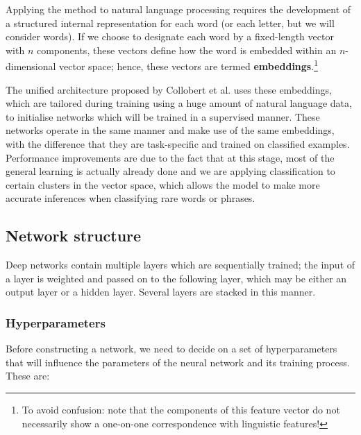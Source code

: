 Applying the method to natural language processing requires the
development of a structured internal representation for each word (or
each letter, but we will consider words).  If we choose to designate
each word by a fixed-length vector with $n$ components, these vectors
define how the word is embedded within an $n$-dimensional vector
space; hence, these vectors are termed
\textbf{embeddings}.\footnote{To avoid confusion: note that the
  components of this feature vector do not necessarily show a one-on-one
  correspondence with linguistic features!} 

The unified architecture proposed by Collobert et al. uses these
embeddings, which are tailored during training using a huge amount of
natural language data, to initialise networks which will be trained in
a supervised manner. These networks operate in the same manner and
make use of the same embeddings, with the difference that they are
task-specific and trained on classified examples. Performance
improvements are due to the fact that at this stage, most of the
general learning is actually already done and we are applying
classification to certain clusters in the vector space, which allows
the model to make more accurate inferences when classifying rare words
or phrases.

\subsection{Network structure}
\label{sec:networkstructure}

Deep networks contain multiple layers which are sequentially trained;
the input of a layer is weighted and passed on to the following layer,
which may be either an output layer or a hidden layer. Several layers
are stacked in this manner.

\subsubsection{Hyperparameters}

Before constructing a network, we need to decide on a set of
hyperparameters that will influence the parameters of the neural
network and its training process. These are:

